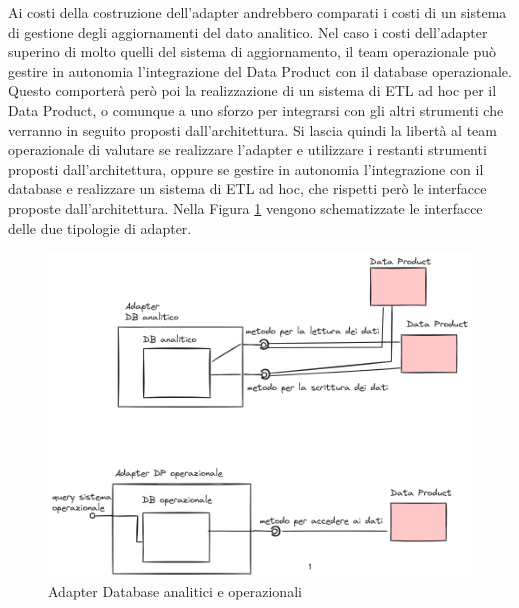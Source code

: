 \documentclass[12pt]{report}
\begin{document}
Ai costi della costruzione dell'adapter andrebbero comparati i costi di un sistema di gestione degli aggiornamenti del dato analitico.
Nel caso i costi dell'adapter superino di molto quelli del sistema di aggiornamento, il team operazionale può gestire in autonomia l'integrazione del Data Product con il database operazionale.
Questo comporterà però poi la realizzazione di un sistema di ETL ad hoc per il Data Product, o comunque a uno sforzo per integrarsi con gli altri strumenti che verranno in seguito proposti dall'architettura.
Si lascia quindi la libertà al team operazionale di valutare se realizzare l'adapter e utilizzare i restanti strumenti proposti dall'architettura, oppure se gestire in autonomia l'integrazione con il database e realizzare un sistema di ETL ad hoc, che rispetti però le interfacce proposte dall'architettura.
Nella Figura \ref{fig:AdapterDB} vengono schematizzate le interfacce delle due tipologie di adapter. 

\begin{figure}
    \centering
    \includegraphics[width =\linewidth]{immagini/Data Mesh con DB Adapter 2024-03-06 17.45.31.excalidraw.png}
    \caption{Adapter Database analitici e operazionali}
    \label{fig:AdapterDB}
\end{figure}
\end{document}
